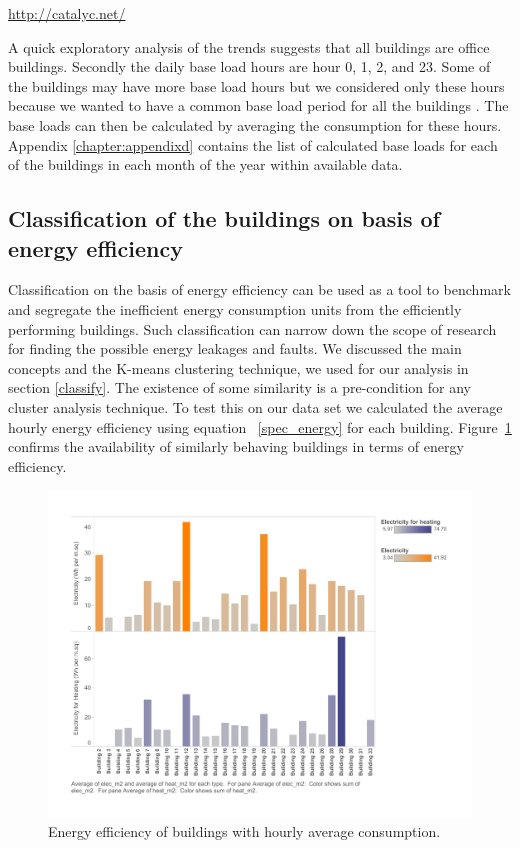\begin{center}

\url{http://catalyc.net/}\end{center}

A quick exploratory analysis of the trends suggests that all buildings are office buildings. Secondly the daily base load hours are hour 0, 1, 2, and 23. Some of the buildings may have more base load hours but we considered only these hours because we wanted to have a common base load period for all the buildings . The base loads can then be calculated by averaging the consumption for these hours. Appendix \ref{chapter:appendixd} contains the list of calculated base loads for each of the buildings in each month of the year within available data.

\subsection{Classification of the buildings on basis of energy efficiency}
Classification on the basis of energy efficiency can be used as a tool to benchmark and segregate the inefficient energy consumption units from the efficiently performing buildings. Such classification can narrow down the scope of research for finding the possible energy leakages and faults. We discussed the main concepts and the K-means clustering technique, we used for our analysis in section \ref{classify}. The existence of some similarity is a pre-condition for any cluster analysis technique. To test this on our data set we calculated the average hourly energy efficiency using equation ~\ref{spec_energy} for each building. Figure~\ref{fig:hr_m2} confirms the availability of similarly behaving buildings in terms of energy efficiency. 
\begin{figure}[!ht]
    \begin{center}
      \includegraphics[scale = 0.6]{images/hr_m2.pdf}
      \caption{Energy efficiency of buildings with hourly average consumption.}
      \label{fig:hr_m2}
    \end{center}
\end{figure} 


